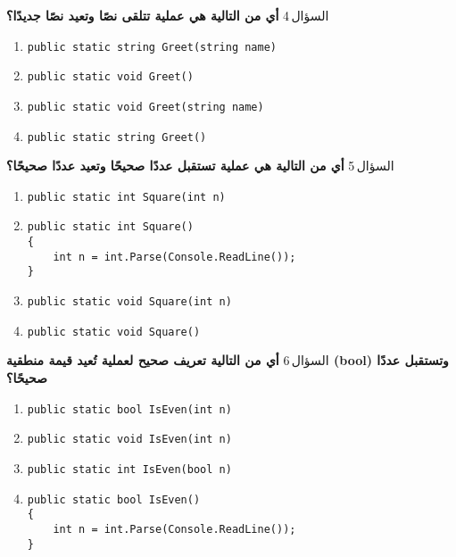 \documentclass[13pt]{beamer}
\begin{document}
\begin{frame}[fragile]{السؤال\,4}
\textbf{أي من التالية هي عملية تتلقى نصًا وتعيد نصًا جديدًا؟}

\begin{english}
\begin{enumerate}[label=(\alph*)]
  \item \texttt{public static string Greet(string name)}
  \item \texttt{public static void Greet()}
  \item \texttt{public static void Greet(string name)}
  \item \texttt{public static string Greet()}
\end{enumerate}
\end{english}
\end{frame}

\begin{frame}[fragile]{السؤال\,5}
\textbf{أي من التالية هي عملية تستقبل عددًا صحيحًا وتعيد عددًا صحيحًا؟}

\begin{english}
\begin{enumerate}[label=(\alph*)]
  \item \texttt{public static int Square(int n)}
  \item
  \begin{lstlisting}[language=CSharp]
public static int Square()
{
    int n = int.Parse(Console.ReadLine());
}
  \end{lstlisting}
  \item \texttt{public static void Square(int n)}
  \item \texttt{public static void Square()}
\end{enumerate}
\end{english}
\end{frame}

\begin{frame}[fragile]{السؤال\,6}
\textbf{أي من التالية تعريف صحيح لعملية تُعيد قيمة منطقية (bool) وتستقبل عددًا صحيحًا؟}

\begin{english}
\begin{enumerate}[label=(\alph*)]
  \item \texttt{public static bool IsEven(int n)}
  \item \texttt{public static void IsEven(int n)}
  \item \texttt{public static int IsEven(bool n)}
  \item
  \begin{lstlisting}[language=CSharp]
public static bool IsEven()
{
    int n = int.Parse(Console.ReadLine());
}
  \end{lstlisting}
\end{enumerate}
\end{english}
\end{frame}
\end{document}
